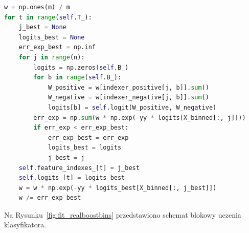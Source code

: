 \begin{lstlisting}[language=Python, caption=Procedura ucząca klasyfikator RealBoostBins., label={lst:fit_realboostbins}]
w = np.ones(m) / m
for t in range(self.T_):
    j_best = None
    logits_best = None
    err_exp_best = np.inf
    for j in range(n):
        logits = np.zeros(self.B_)
        for b in range(self.B_):
            W_positive = w[indexer_positive[j, b]].sum()
            W_negative = w[indexer_negative[j, b]].sum()
            logits[b] = self.logit(W_positive, W_negative)
        err_exp = np.sum(w * np.exp(-yy * logits[X_binned[:, j]]))
        if err_exp < err_exp_best:
            err_exp_best = err_exp
            logits_best = logits
            j_best = j
    self.feature_indexes_[t] = j_best
    self.logits_[t] = logits_best
    w = w * np.exp(-yy * logits_best[X_binned[:, j_best]])
    w /= err_exp_best

\end{lstlisting}
Na Rysunku~\ref{fig:fit_realboostbins} przedstawiono schemat blokowy uczenia klasyfikatora.
